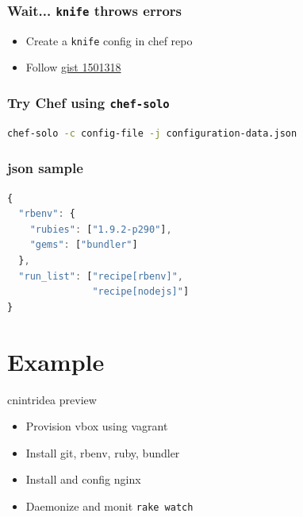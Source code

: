 \documentclass[xetex,mathserif,serif,12pt]{beamer}
\begin{document}
\begin{frame}
  \frametitle{Wait... \texttt{knife} throws errors}

  \begin{itemize}
  \item Create a \texttt{knife} config in chef repo
  \item Follow \href{https://gist.github.com/1501318}{gist 1501318}
  \end{itemize}

\end{frame}

\begin{frame}[fragile]
  \frametitle{Try Chef using \texttt{chef-solo}}

  \begin{beamer@nomargin}
    \begin{lstlisting}[language=Bash]
chef-solo -c config-file -j configuration-data.json
    \end{lstlisting}
  \end{beamer@nomargin}

\end{frame}

\begin{frame}[fragile]
  \frametitle{json sample}

  \begin{beamer@nomargin}
    \begin{lstlisting}[language=JavaScript]
{
  "rbenv": {
    "rubies": ["1.9.2-p290"],
    "gems": ["bundler"]
  },
  "run_list": ["recipe[rbenv]",
               "recipe[nodejs]"]
}
    \end{lstlisting}
  \end{beamer@nomargin}

\end{frame}

\section{Example}
\label{sec:ex}

\begin{frame}{cnintridea preview}
  \begin{itemize}
  \item Provision vbox using \alert{vagrant}
  \item Install git, rbenv, ruby, bundler
  \item Install and config nginx
  \item Daemonize and monit \texttt{rake watch}
  \end{itemize}
\end{frame}
\end{document}
